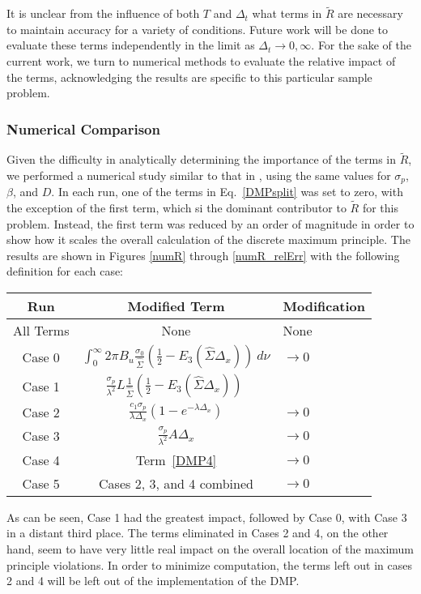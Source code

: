 It is unclear from the influence of both $T$ and $\Delta_t$ what terms in
$\tilde R$ are necessary to maintain accuracy for a variety of conditions. 
Future work will be done to evaluate these terms independently in the limit as
$\Delta_t\to 0, \infty$.  For the sake of the current work,
we turn to numerical methods to evaluate the relative impact of the terms,
acknowledging the results are specific to this particular sample problem.

\subsubsection{Numerical Comparison}
Given the difficulty in analytically determining the importance of the terms in
$\tilde R$, we performed a numerical study similar to that in \cite{WolLarDen},
using the
same values for $\sigma_p$, $\beta$, and $D$.  In each run, one of the terms
in
Eq.\ \eqref{DMPsplit} was set to zero, with the exception of the first term,
which si the dominant contributor to $\tilde R$ for this problem.  Instead, the
first term
was reduced by an order of magnitude in order to show how it scales the overall
calculation of the
discrete maximum principle.  The results are shown in Figures \ref{numR} through
\ref{numR_relErr} with the following definition for each case:
\begin{center}
\begin{tabular}{c c l}
Run & Modified Term & Modification  \\ \hline \medskip
All Terms & None &  None\\ \medskip
Case 0    & $\int_0^\infty2\pi B_u\frac{\sigma_0}{\hat\Sigma}
  \left(\frac{1}{2}-E_3(\hat\Sigma\Delta_x)\right)\ d\nu $& $\to 0$ \\ \medskip
Case 1    & $\frac{\sigma_p}{\lambda^2}L\frac{1}{\hat\Sigma}
  \left(\frac{1}{2}-E_3(\hat\Sigma\Delta_x)\right)\;$& \textdiv 10  \\ \medskip
Case 2    & $\frac{c_1\sigma_p}{\lambda\Delta_x} 
  \left(1-e^{-\lambda\Delta_x}\right) $ &$\to0$ \\ \medskip
Case 3    & $\frac{\sigma_p}{\lambda^2}A\Delta_x $ &$\to0$  \\ \medskip
Case 4    & Term\ \eqref{DMP4} & $\to0$  \\ \medskip
Case 5    & Cases 2, 3, and 4 combined &$\to0$
\end{tabular}
\end{center}
As can be seen, Case 1 had the greatest impact, followed by
Case 0, with Case 3 in a distant third place.  The terms
eliminated in Cases 2 and 4, on the other hand, seem to have very little real
impact on the overall location of the maximum principle violations.  In order to
minimize computation,
the terms left out in cases 2 and 4 will be left out of the
implementation of the DMP.


